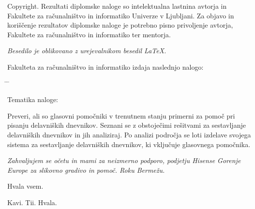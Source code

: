 \documentclass[a4paper, 12pt]{book}
\newcommand{\clearemptydoublepage}{\newpage{\pagestyle{empty}\cleardoublepage}}
\begin{document}
\noindent
{\sc Copyright}. 
Rezultati diplomske naloge so intelektualna lastnina avtorja in Fakultete za računalništvo in informatiko Univerze v Ljubljani.
Za objavo in koriščenje rezultatov diplomske naloge je potrebno pisno privoljenje avtorja, Fakultete za računalništvo in informatiko ter mentorja.

\begin{center}
\mbox{}\vfill
\emph{Besedilo je oblikovano z urejevalnikom besedil \LaTeX.}
\end{center}
\clearemptydoublepage

\thispagestyle{empty}
\vspace*{4cm}

\noindent
Fakulteta za računalništvo in informatiko izdaja naslednjo nalogo:
\medskip
\begin{tabbing}
\hspace{32mm}\= \hspace{6cm} \= \kill




Tematika naloge:
\end{tabbing}
Preveri, ali so glasovni pomočniki v trenutnem stanju primerni za pomoč pri pisanju delavniških dnevnikov.
Seznani se z obstoječimi rešitvami za sestavljanje delavniških dnevnikov in jih analiziraj.
Po analizi področja se loti izdelave svojega sistema za sestavljanje delavniških dnevnikov, ki vključuje glasovnega pomočnika.
\vspace{15mm}



\vspace{2cm}

\clearemptydoublepage

\thispagestyle{empty}\mbox{}\vfill\null\it%
\noindent
Zahvaljujem se očetu in mami za neizmerno podporo, podjetju Hisense Gorenje Europe za slikovno gradivo in pomoč.
Roku Bermežu.

Hvala vsem.
\rm\normalfont

\clearemptydoublepage

\thispagestyle{empty}\mbox{}{\textheight}\mbox{}\hfill\begin{minipage}{0.55\textwidth}%
	Kavi. Tii. Hvala.
\normalfont\end{minipage}
\end{document}
